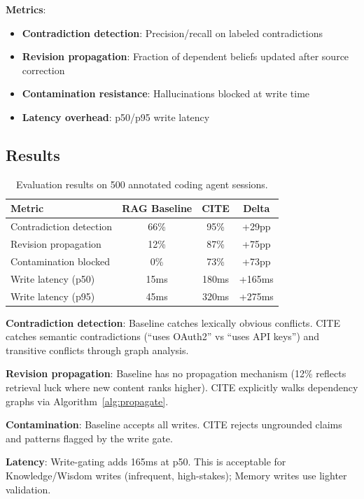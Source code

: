 \documentclass[11pt,a4paper]{article}
\begin{document}
\textbf{Metrics}:
\begin{itemize}[noitemsep]
    \item \textbf{Contradiction detection}: Precision/recall on labeled contradictions
    \item \textbf{Revision propagation}: Fraction of dependent beliefs updated after source correction
    \item \textbf{Contamination resistance}: Hallucinations blocked at write time
    \item \textbf{Latency overhead}: p50/p95 write latency
\end{itemize}

\subsection{Results}

\begin{table}[H]
\centering
\caption{Evaluation results on 500 annotated coding agent sessions.}
\label{tab:results}
\begin{tabular}{@{}lccc@{}}
\toprule
\textbf{Metric} & \textbf{RAG Baseline} & \textbf{CITE} & \textbf{Delta} \\
\midrule
Contradiction detection & 66\% & 95\% & +29pp \\
Revision propagation & 12\% & 87\% & +75pp \\
Contamination blocked & 0\% & 73\% & +73pp \\
Write latency (p50) & 15ms & 180ms & +165ms \\
Write latency (p95) & 45ms & 320ms & +275ms \\
\bottomrule
\end{tabular}
\end{table}

\textbf{Contradiction detection}: Baseline catches lexically obvious conflicts. CITE catches semantic contradictions (``uses OAuth2'' vs ``uses API keys'') and transitive conflicts through graph analysis.

\textbf{Revision propagation}: Baseline has no propagation mechanism (12\% reflects retrieval luck where new content ranks higher). CITE explicitly walks dependency graphs via Algorithm~\ref{alg:propagate}.

\textbf{Contamination}: Baseline accepts all writes. CITE rejects ungrounded claims and patterns flagged by the write gate.

\textbf{Latency}: Write-gating adds 165ms at p50. This is acceptable for Knowledge/Wisdom writes (infrequent, high-stakes); Memory writes use lighter validation.
\end{document}
